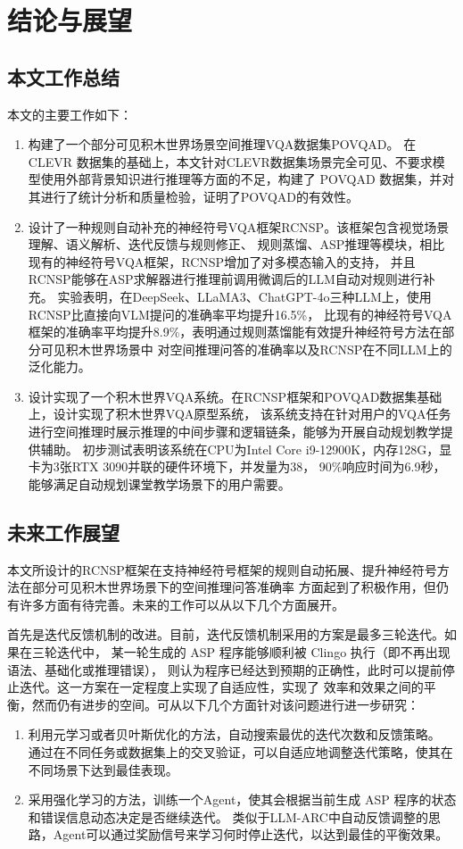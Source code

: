 \chapter{结论与展望}
\section{本文工作总结}
本文的主要工作如下：
\begin{enumerate}[nosep]
\item 构建了一个部分可见积木世界场景空间推理VQA数据集POVQAD。
在 CLEVR 数据集的基础上，本文针对CLEVR数据集场景完全可见、不要求模型使用外部背景知识进行推理等方面的不足，构建了 POVQAD 数据集，并对其进行了统计分析和质量检验，证明了POVQAD的有效性。
\item 设计了一种规则自动补充的神经符号VQA框架RCNSP。该框架包含视觉场景理解、语义解析、迭代反馈与规则修正、
规则蒸馏、ASP推理等模块，相比现有的神经符号VQA框架，RCNSP增加了对多模态输入的支持，
并且RCNSP能够在ASP求解器进行推理前调用微调后的LLM自动对规则进行补充。
实验表明，在DeepSeek、LLaMA3、ChatGPT-4o三种LLM上，使用RCNSP比直接向VLM提问的准确率平均提升16.5\%，
比现有的神经符号VQA框架的准确率平均提升8.9\%，表明通过规则蒸馏能有效提升神经符号方法在部分可见积木世界场景中
对空间推理问答的准确率以及RCNSP在不同LLM上的泛化能力。
\item 设计实现了一个积木世界VQA系统。在RCNSP框架和POVQAD数据集基础上，设计实现了积木世界VQA原型系统，
该系统支持在针对用户的VQA任务进行空间推理时展示推理的中间步骤和逻辑链条，能够为开展自动规划教学提供辅助。
初步测试表明该系统在CPU为Intel Core i9-12900K，内存128G，显卡为3张RTX 3090并联的硬件环境下，并发量为38，
90\%响应时间为6.9秒，能够满足自动规划课堂教学场景下的用户需要。
\end{enumerate}
\section{未来工作展望}
本文所设计的RCNSP框架在支持神经符号框架的规则自动拓展、提升神经符号方法在部分可见积木世界场景下的空间推理问答准确率
方面起到了积极作用，但仍有许多方面有待完善。未来的工作可以从以下几个方面展开。

首先是迭代反馈机制的改进。目前，迭代反馈机制采用的方案是最多三轮迭代。如果在三轮迭代中，
某一轮生成的 ASP 程序能够顺利被 Clingo 执行（即不再出现语法、基础化或推理错误），
则认为程序已经达到预期的正确性，此时可以提前停止迭代。这一方案在一定程度上实现了自适应性，实现了
效率和效果之间的平衡，然而仍有进步的空间。可从以下几个方面针对该问题进行进一步研究：
\begin{enumerate}[nosep]
    \item 利用元学习或者贝叶斯优化的方法，自动搜索最优的迭代次数和反馈策略。
通过在不同任务或数据集上的交叉验证，可以自适应地调整迭代策略，使其在不同场景下达到最佳表现。
    \item 采用强化学习的方法，训练一个Agent，使其会根据当前生成 ASP 程序的状态和错误信息动态决定是否继续迭代。
类似于LLM-ARC中自动反馈调整的思路，Agent可以通过奖励信号来学习何时停止迭代，以达到最佳的平衡效果\cite{kalyanpur2024llmarcenhancingllmsautomated}。
\end{enumerate}

